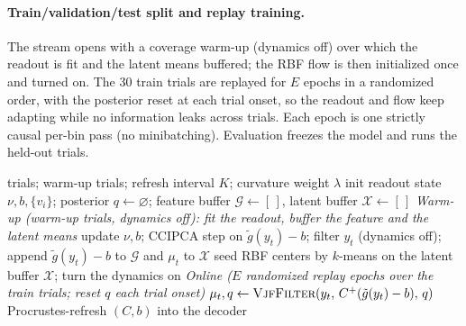 \documentclass{article}
\newcommand{\svjf}{sVJF}
\begin{document}
\paragraph{Train/validation/test split and replay training.}
The stream opens with a coverage warm-up (dynamics off) over which the readout is fit and the
latent means buffered; the RBF flow is then initialized once and turned on. The 30 train
trials are replayed for $E$ epochs in a randomized order, with the posterior reset at each
trial onset, so the readout and flow keep adapting while no information leaks across trials.
Each epoch is one strictly causal per-bin pass (no minibatching). Evaluation freezes the model
and runs the held-out trials.

\begin{algorithm}[t]
\caption{\svjf{} on V1: warm-up then $E$ replay epochs (per-trial reset). Key additions -- the
  scale-fixed CCIPCA warm-start, the curvature penalty, and the growing basis -- are boxed.}
\label{alg:svjf}
\begin{algorithmic}[1]
\Require trials; warm-up trials; refresh interval $K$; curvature weight $\lambda$
\State init readout state $\nu,b,\{v_i\}$; posterior $q\gets\varnothing$; feature buffer
  $\mathcal G\gets[\,]$, latent buffer $\mathcal X\gets[\,]$
\Statex \textit{Warm-up (warm-up trials, dynamics off): fit the readout, buffer the feature and the latent means}
  \State update $\nu,b$; CCIPCA step on $\tilde g(y_t)-b$; filter $y_t$ (dynamics off);
    append $\tilde g(y_t)-b$ to $\mathcal G$ and $\mu_t$ to $\mathcal X$
\EndFor
\State {}
\State seed RBF centers by $k$-means on the latent buffer $\mathcal X$; turn the dynamics on
\Statex \textit{Online ($E$ randomized replay epochs over the train trials; reset $q$ each trial onset)}
  \State $\mu_t,q\gets\textsc{VjfFilter}(y_t,\,C^{+}(\tilde g(y_t)-b),\,q)$ 
  \State {}
  \State {}
   Procrustes-refresh $(C,b)$ into the decoder \EndIf
\EndFor
\end{algorithmic}
\end{algorithm}
\end{document}
